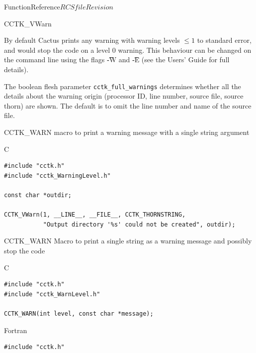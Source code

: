 \begin{cactuspart}{FunctionReference}{$RCSfile$}{$Revision$}
\begin{FunctionDescription}{CCTK\_VWarn}
\begin{Discussion}
By default Cactus prints any warning with warning levels $\le 1$ to standard
error, and would stop the code on a level 0 warning.
This behaviour can be changed on the command line using
the flags {\t -W} and {\t -E} (see the Users' Guide for full details).

The boolean flesh parameter {\tt cctk\_full\_warnings} determines whether all
the details about the warning origin (processor ID, line number, source file,
source thorn) are shown. The default is to omit the line number and name of the
source file.
\end{Discussion}

\begin{SeeAlsoSection}
\begin{SeeAlso}{CCTK\_WARN}
macro to print a warning message with a single string argument
\end{SeeAlso}
\end{SeeAlsoSection}

\begin{ExampleSection}
\begin{Example}{C}
\begin{verbatim}
#include "cctk.h"
#include "cctk_WarningLevel.h"

const char *outdir;

CCTK_VWarn(1, __LINE__, __FILE__, CCTK_THORNSTRING,
           "Output directory '%s' could not be created", outdir);
\end{verbatim}
\end{Example}
\end{ExampleSection}
\end{FunctionDescription}






\begin{FunctionDescription}{CCTK\_WARN}
\label{CCTK-WARN}
Macro to print a single string as a warning message and possibly stop the code

\begin{SynopsisSection}
\begin{Synopsis}{C}
\begin{verbatim}
#include "cctk.h"
#include "cctk_WarnLevel.h"

CCTK_WARN(int level, const char *message);
\end{verbatim}
\end{Synopsis}
\begin{Synopsis}{Fortran}
\begin{verbatim}
#include "cctk.h"


\end{verbatim}
\end{Synopsis}
\end{SynopsisSection}
\end{FunctionDescription}
\end{cactuspart}
